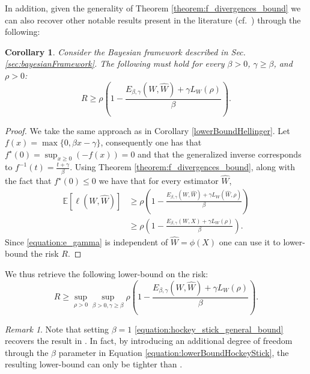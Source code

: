 \documentclass[conference]{IEEEtran}
\theoremstyle{plain}
\newtheorem{corollary}{Corollary}
\theoremstyle{definition}
\theoremstyle{remark}
\newtheorem{remark}{Remark}
\newcommand{\E}{\mathbb{E}}
\begin{document}
In addition, given the generality of Theorem \ref{theorem:f_divergences_bound} we can also recover other notable results present in the literature (cf.~\cite[Remark 1]{CalmonSDPIHockeyStick}) through the following:
\begin{corollary}\label{lowerBoundHockeyStick}
Consider the Bayesian framework described in Sec. \ref{sec:bayesianFramework}. The following must hold for every $\beta > 0$, $\gamma\geq \beta$, and $\rho>0$:
\begin{equation}\label{equation:hockey_stick_general_bound}
     R \geq \rho\left(1 - \frac{E_{\beta, \gamma}(W,\hat{W}) + \gamma L_W(\rho)}{\beta}\right).
\end{equation}
\end{corollary}
\begin{proof}
We take the same approach as in Corollary \ref{lowerBoundHellinger}. Let $f(x) = \max\{0, \beta x-\gamma\}$, consequently one has that $f^\star(0) = \sup_{x \geq 0} (- f(x)) = 0$ and that the generalized inverse corresponds to $f^{-1}(t) = \frac{t+\gamma}{\beta}$. Using Theorem \ref{theorem:f_divergences_bound}, along with the fact that $f^\star(0) \leq 0$ we have that for every estimator $\hat{W}$,
\begin{align}
    \E[\ell(W, \hat{W})] &\geq  
    \rho\left(1-\frac{E_{\beta,\gamma}(W, \hat{W}) + \gamma L_W(\hat{W}, \rho)}{\beta}\right) \\ 
    &\geq \rho\left(1-\frac{E_{\beta, \gamma}(W, X) + \gamma L_W(\rho)}{\beta}\right). \label{equation:e_gamma}
\end{align}
Since \eqref{equation:e_gamma} is independent of $\hat{W}=\phi(X)$ one can use it to lower-bound the risk $R$.
\end{proof}
We thus retrieve the following lower-bound on the risk:
\begin{equation}\label{equation:lowerBoundHockeyStick}
     R \geq \sup_{\rho>0}\sup_{\beta>0, \gamma \geq \beta}\rho\left(1 - \frac{E_{\beta, \gamma}(W,\hat{W}) + \gamma L_{W}(\rho)}{\beta}\right).
\end{equation}
\begin{remark}
Note that setting $\beta = 1$ \eqref{equation:hockey_stick_general_bound} recovers the result in \cite[Remark 1]{CalmonSDPIHockeyStick}.
In fact, by introducing an additional degree of freedom through the $\beta$ parameter in Equation \eqref{equation:lowerBoundHockeyStick}, the resulting lower-bound can only be tighter than \cite[Remark 1]{CalmonSDPIHockeyStick}.
\end{remark}
\end{document}
